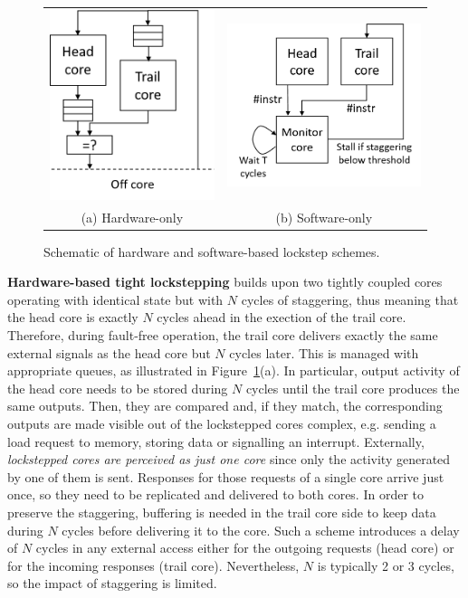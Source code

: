 \begin{figure}[t!]
\centering
\begin{tabular}{cc}
  \includegraphics[width=0.40\columnwidth]{imgs/HWlockstep.png} & 
  \includegraphics[width=0.50\columnwidth]{imgs/SWlockstep.png} \\
  (a) Hardware-only & (b) Software-only \\
\end{tabular}
  \caption{Schematic of hardware and software-based lockstep schemes.}
  \label{fig:HWSWlockstep}
\end{figure}

\textbf{Hardware-based tight lockstepping} builds upon two tightly coupled cores operating with identical state but with $N$ cycles of staggering, thus meaning that the head core is exactly $N$ cycles ahead in the exection of the trail core. Therefore, during fault-free operation, the trail core delivers exactly the same external signals as the head core but $N$ cycles later. This is managed with appropriate queues, as illustrated in Figure~\ref{fig:HWSWlockstep}(a). In particular, output activity of the head core needs to be stored during $N$ cycles until the trail core produces the same outputs. Then, they are compared and, if they match, the corresponding outputs are made visible out of the lockstepped cores complex, e.g. sending a load request to memory, storing data or signalling an interrupt. Externally, \emph{lockstepped cores are perceived as just one core} since only the activity generated by one of them is sent. Responses for those requests of a single core arrive just once, so they need to be replicated and delivered to both cores. In order to preserve the staggering, buffering is needed in the trail core side to keep data during $N$ cycles before delivering it to the core.
Such a scheme introduces a delay of $N$ cycles in any external access either for the outgoing requests (head core) or for the incoming responses (trail core). Nevertheless, $N$ is typically 2 or 3 cycles, so the impact of staggering is limited.

